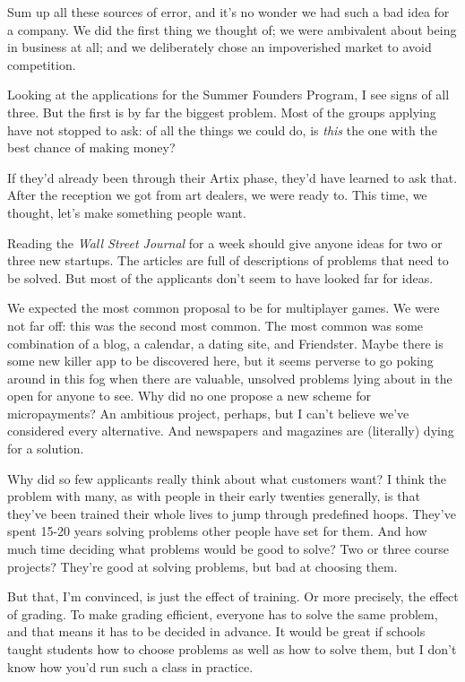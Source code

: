 Sum up all these sources of error, and it's no wonder we had such a bad
idea for a company. We did the first thing we thought of; we were
ambivalent about being in business at all; and we deliberately chose an
impoverished market to avoid competition.

Looking at the applications for the Summer Founders Program, I see signs
of all three. But the first is by far the biggest problem. Most of the
groups applying have not stopped to ask: of all the things we could do,
is \emph{this} the one with the best chance of making money?

If they'd already been through their Artix phase, they'd have learned to
ask that. After the reception we got from art dealers, we were ready to.
This time, we thought, let's make something people want.

Reading the \emph{Wall Street Journal} for a week should give anyone
ideas for two or three new startups. The articles are full of
descriptions of problems that need to be solved. But most of the
applicants don't seem to have looked far for ideas.

We expected the most common proposal to be for multiplayer games. We
were not far off: this was the second most common. The most common was
some combination of a blog, a calendar, a dating site, and Friendster.
Maybe there is some new killer app to be discovered here, but it seems
perverse to go poking around in this fog when there are valuable,
unsolved problems lying about in the open for anyone to see. Why did no
one propose a new scheme for micropayments? An ambitious project,
perhaps, but I can't believe we've considered every alternative. And
newspapers and magazines are (literally) dying for a solution.

Why did so few applicants really think about what customers want? I
think the problem with many, as with people in their early twenties
generally, is that they've been trained their whole lives to jump
through predefined hoops. They've spent 15-20 years solving problems
other people have set for them. And how much time deciding what problems
would be good to solve? Two or three course projects? They're good at
solving problems, but bad at choosing them.

But that, I'm convinced, is just the effect of training. Or more
precisely, the effect of grading. To make grading efficient, everyone
has to solve the same problem, and that means it has to be decided in
advance. It would be great if schools taught students how to choose
problems as well as how to solve them, but I don't know how you'd run
such a class in practice.

